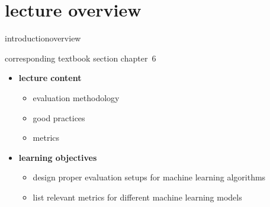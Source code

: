 


\subtitle{Module 6.0: Evaluation and Metrics}


	

    \section[overview]{lecture overview}
        \begin{frame}{introduction}{overview}
            \begin{block}{corresponding textbook section}
                    chapter~6
            \end{block}

            \begin{itemize}
                \item   \textbf{lecture content}
                    \begin{itemize}
                        \item   evaluation methodology
                        \item   good practices
                        \item   metrics
                    \end{itemize}
                \bigskip
                \item<2->   \textbf{learning objectives}
                    \begin{itemize}
                        \item   design proper evaluation setups for machine learning algorithms
                        \item   list relevant metrics for different machine learning models
                    \end{itemize}
            \end{itemize}
        \end{frame}

